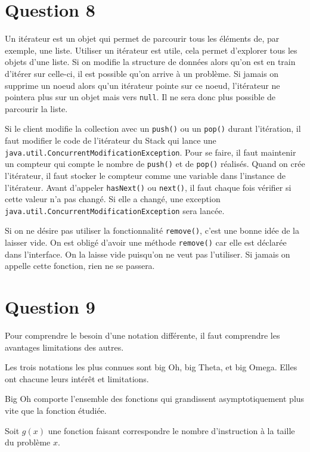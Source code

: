 \documentclass[a4paper,10pt]{article}
\begin{document}
\section*{Question 8}

Un itérateur est un objet qui permet de parcourir tous les éléments de, par exemple, une liste.
Utiliser un itérateur est utile, cela permet d'explorer tous les objets d'une liste.
Si on modifie la structure de données alors qu'on est en train d'itérer sur celle-ci, il est possible qu'on arrive à un problème. Si jamais on supprime un noeud alors qu'un itérateur pointe sur ce noeud, l'itérateur ne pointera plus sur un objet mais vers \texttt{null}. Il ne sera donc plus possible de parcourir la liste.

Si le client modifie la collection avec un \texttt{push()} ou un \texttt{pop()} durant l'itération, il faut modifier le code de l'itérateur du Stack qui lance une \texttt{java.util.ConcurrentModificationException}. Pour se faire, il faut maintenir un compteur qui compte le nombre de \texttt{push()} et de \texttt{pop()} réalisés. Quand on crée l'itérateur, il faut stocker le compteur comme une variable dans l'instance de l'itérateur. Avant d'appeler \texttt{hasNext()} ou \texttt{next()}, il faut chaque fois vérifier si cette valeur n'a pas changé. Si elle a changé, une exception \texttt{java.util.ConcurrentModificationException} sera lancée.

Si on ne désire pas utiliser la fonctionnalité \texttt{remove()}, c'est une bonne idée de la laisser vide. On est obligé d'avoir une méthode \texttt{remove()} car elle est déclarée dans l'interface. On la laisse vide puisqu'on ne veut pas l'utiliser. Si jamais on appelle cette fonction, rien ne se passera.

\section*{Question 9}

Pour comprendre le besoin d'une notation différente, il faut comprendre les avantages limitations des autres.

Les trois notations les plus connues sont big Oh, big Theta, et big Omega. Elles ont chacune leurs intérêt et limitations.

Big Oh comporte l'ensemble des fonctions qui grandissent asymptotiquement plus vite que la fonction étudiée.

Soit $g(x)$ une fonction faisant correspondre le nombre d'instruction à la taille du problème $x$.
\end{document}
